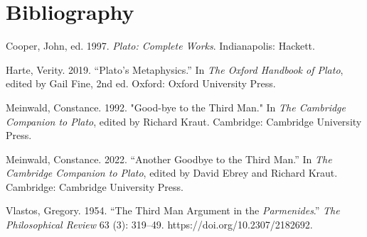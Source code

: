 \documentclass [article] {memoir}
\begin{document}
\chapter{Bibliography}
Cooper, John, ed. 1997. \textit{Plato: Complete Works}. Indianapolis: Hackett.

Harte, Verity. 2019. ``Plato's Metaphysics.'' In \textit{The Oxford Handbook of Plato}, edited by Gail Fine, 2nd ed. Oxford: Oxford University Press.

Meinwald, Constance. 1992. "Good-bye to the Third Man." In \textit{The Cambridge Companion to Plato}, edited by Richard Kraut. Cambridge: Cambridge University Press.

Meinwald, Constance. 2022. “Another Goodbye to the Third Man.” In \textit{The Cambridge Companion to Plato}, edited by David Ebrey and Richard Kraut. Cambridge: Cambridge University Press. 

Vlastos, Gregory. 1954. “The Third Man Argument in the \textit{Parmenides}.” \textit{The Philosophical Review} 63 (3): 319–49. https://doi.org/10.2307/2182692.
\end{document}
